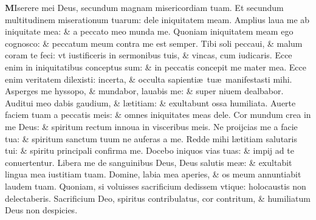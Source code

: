 \documentclass[a5paper,10pt]{book}
\def\ae{æ}
\begin{document}
\begin{multicols*}{2}
\lettrine[lines=2]{\bfseries \color{red} M}{}Iserere mei Deus, secundum magnam misericordiam tuam.
\newline \color{red} E\color{black}t secundum multitudinem miserationum tuarum: dele iniquitatem meam.
\newline \color{red} A\color{black}mplius laua me ab iniquitate mea: \& a peccato meo munda me.
\newline \color{red} Q\color{black}uoniam iniquitatem meam ego cognosco: \& peccatum meum contra me est semper.
\newline \color{red} T\color{black}ibi soli peccaui, \& malum coram te feci: vt iustificeris in sermonibus tuis, \& vincas, cum iudicaris.
\newline \color{red} E\color{black}cce enim in iniquitatibus conceptus sum: \& in peccatis concepit me mater mea.
\newline \color{red} E\color{black}cce enim veritatem dilexisti: incerta, \& occulta sapienti\ae \ tu\ae \ manifestasti mihi.
\newline \color{red} A\color{black}sperges me hyssopo, \& mundabor, lauabis me: \& super niuem dealbabor.
\newline \color{red} A\color{black}uditui meo dabis gaudium, \& l\ae titiam: \& exultabunt ossa humiliata.
\newline \color{red} A\color{black}uerte faciem tuam a peccatis meis: \& omnes iniquitates meas dele.
\newline \color{red} C\color{black}or mundum crea in me Deus: \& spiritum rectum innoua in visceribus meis.
\newline \color{red} N\color{black}e proijcias me a facie tua: \& spiritum sanctum tuum ne auferas a me.
\newline \color{red} R\color{black}edde mihi l\ae titiam salutaris tui: \& spiritu principali confirma me.
\newline \color{red} D\color{black}ocebo iniquos vias tuas: \& impij ad te conuertentur.
\newline \color{red} L\color{black}ibera me de sanguinibus Deus, Deus salutis me\ae : \& exultabit lingua mea iustitiam tuam.
\newline \color{red} D\color{black}omine, labia mea aperies, \& os meum annuntiabit laudem tuam.
\newline \color{red} Q\color{black}uoniam, si voluisses sacrificium dedissem vtique: holocaustis non delectaberis.
\newline \color{red} S\color{black}acrificium Deo, spiritus contribulatus, cor contritum, \& humiliatum Deus non despicies.

\end{multicols*}
\end{document}
